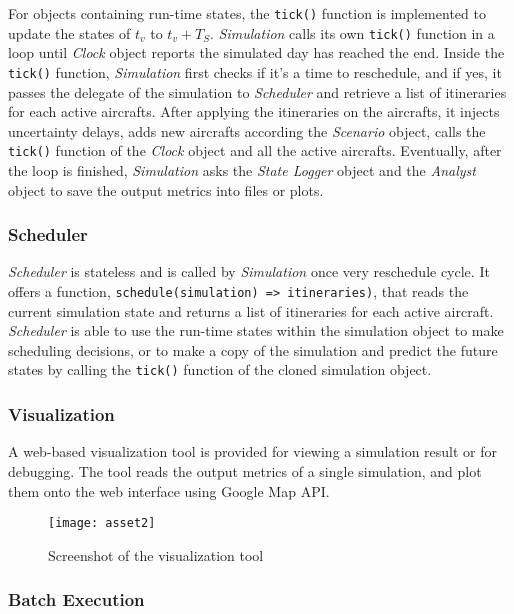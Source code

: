 \documentclass[letterpaper, 10 pt, conference]{ieeeconf}
\newcommand{\inlinecode}{\texttt}
\begin{document}
For objects containing run-time states, the \inlinecode{tick()} function is implemented to update the states of $t_v$ to $t_v + T_S$. {\it Simulation} calls its own \inlinecode{tick()} function in a loop until {\it Clock} object reports the simulated day has reached the end. Inside the \inlinecode{tick()} function, {\it Simulation} first checks if it's a time to reschedule, and if yes, it passes the delegate of the simulation to {\it Scheduler} and retrieve a list of itineraries for each active aircrafts. After applying the itineraries on the aircrafts, it injects uncertainty delays, adds new aircrafts according the {\it Scenario} object, calls the \inlinecode{tick()} function of the {\it Clock} object and all the active aircrafts. Eventually, after the loop is finished, {\it Simulation} asks the {\it State Logger} object and the {\it Analyst} object to save the output metrics into files or plots.

\subsubsection{Scheduler}

{\it Scheduler} is stateless and is called by {\it Simulation} once very reschedule cycle. It offers a function, \inlinecode{schedule(simulation) => itineraries)}, that reads the current simulation state and returns a list of itineraries for each active aircraft. {\it Scheduler} is able to use the run-time states within the simulation object to make scheduling decisions, or to make a copy of the simulation and predict the future states by calling the \inlinecode{tick()} function of the cloned simulation object.

\subsubsection{Visualization}

A web-based visualization tool is provided for viewing a simulation result or for debugging. The tool reads the output metrics of a single simulation, and plot them onto the web interface using Google Map API.

\begin{figure}[h]
\caption{Screenshot of the visualization tool}
\centering
\texttt{[image: asset2]}
\label{asset2-screenshot}
\end{figure}

\subsubsection{Batch Execution}
\end{document}
